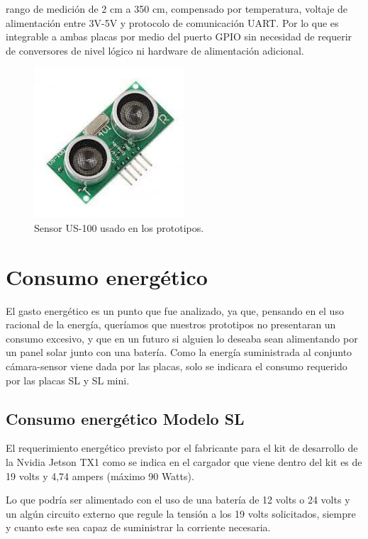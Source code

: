 rango de medición de 2 cm a 350 cm, compensado por temperatura, voltaje de alimentación entre 3V-5V y protocolo de
comunicación UART. Por lo que es integrable a ambas placas por medio del puerto GPIO sin necesidad de requerir de conversores de nivel lógico
ni hardware de alimentación adicional.
\begin{figure}
    \centering
    \includegraphics[width=0.5\textwidth]{imgs/us-100.jpg}
    \caption{Sensor US-100 usado en los prototipos.}
    \label{fig:sensor-US100}
\end{figure}

\section{Consumo energético}

El gasto energético es un punto que fue analizado, ya que, pensando en el uso racional de la energía, queríamos que nuestros prototipos no
presentaran un consumo excesivo, y que en un futuro si alguien lo deseaba sean alimentando por un panel solar junto con una batería.
Como la energía suministrada al conjunto cámara-sensor viene dada por las placas, solo se indicara el consumo requerido por las placas SL y SL mini.
\subsection{Consumo energético Modelo SL}

El requerimiento energético previsto por el fabricante para el kit de desarrollo de la Nvidia Jetson TX1 como se indica
en el cargador que viene dentro del kit es de 19 volts y 4,74 ampers (máximo 90 Watts).

Lo que podría ser alimentado con el uso de una batería de 12 volts o 24 volts y un algún circuito externo que regule la
tensión a los 19 volts solicitados, siempre y cuanto este sea capaz de suministrar la corriente necesaria.

